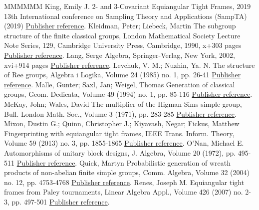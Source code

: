 \documentclass[11pt]{article}
\theoremstyle{definition}
\numberwithin{equation}{section}
\begin{document}
\begin{thebibliography}{MMMMMM}
 King, Emily J. 2- and 3-Covariant Equiangular Tight Frames, 2019 13th International conference on Sampling Theory and Applications (SampTA) (2019) \href{https://alco.centre-mersenne.org/articles/10.5802/alco.324/#King:19}{Publisher reference}.
 Kleidman, Peter; Liebeck, Martin The subgroup structure of the finite classical groups, London Mathematical Society Lecture Note Series, 129, Cambridge University Press, Cambridge, 1990, x+303 pages \href{https://alco.centre-mersenne.org/articles/10.5802/alco.324/#KleidmanLiebeck:90}{Publisher reference}.
 Lang, Serge Algebra, Springer-Verlag, New York, 2002, xvi+914 pages \href{https://alco.centre-mersenne.org/articles/10.5802/alco.324/#Lang:02}{Publisher reference}.
 Levchuk, V. M.; Nuzhin, Ya. N. The structure of Ree groups, Algebra i Logika, Volume 24 (1985) no. 1, pp. 26-41 \href{https://alco.centre-mersenne.org/articles/10.5802/alco.324/#Levchuk:85}{Publisher reference}.
 Malle, Gunter; Saxl, Jan; Weigel, Thomas Generation of classical groups, Geom. Dedicata, Volume 49 (1994) no. 1, pp. 85-116 \href{https://alco.centre-mersenne.org/articles/10.5802/alco.324/#MSW:94}{Publisher reference}.
 McKay, John; Wales, David The multiplier of the Higman-Sims simple group, Bull. London Math. Soc., Volume 3 (1971), pp. 283-285 \href{https://alco.centre-mersenne.org/articles/10.5802/alco.324/#McKayWales:71}{Publisher reference}.
 Mixon, Dustin G.; Quinn, Christopher J.; Kiyavash, Negar; Fickus, Matthew Fingerprinting with equiangular tight frames, IEEE Trans. Inform. Theory, Volume 59 (2013) no. 3, pp. 1855-1865 \href{https://alco.centre-mersenne.org/articles/10.5802/alco.324/#MixonQuinnKiyavashFickus:13}{Publisher reference}.
 O’Nan, Michael E. Automorphisms of unitary block designs, J. Algebra, Volume 20 (1972), pp. 495-511 \href{https://alco.centre-mersenne.org/articles/10.5802/alco.324/#ONan:72}{Publisher reference}.
 Quick, Martyn Probabilistic generation of wreath products of non-abelian finite simple groups, Comm. Algebra, Volume 32 (2004) no. 12, pp. 4753-4768 \href{https://alco.centre-mersenne.org/articles/10.5802/alco.324/#Quick:04}{Publisher reference}.
 Renes, Joseph M. Equiangular tight frames from Paley tournaments, Linear Algebra Appl., Volume 426 (2007) no. 2-3, pp. 497-501 \href{https://alco.centre-mersenne.org/articles/10.5802/alco.324/#Renes:07}{Publisher reference}.

\end{thebibliography}
\end{document}
